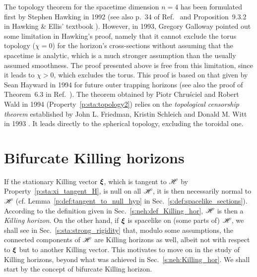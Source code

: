 \begin{hist}
The topology theorem for the spacetime dimension $n=4$ has been formulated
first by Stephen Hawking in 1992 \cite{Hawki72}
(see also p.~34 of Ref.~\cite{Hawki73} and Proposition~9.3.2 in Hawking \& Ellis' textbook
\cite{HawkiE73}).
However, in 1993, Gregory Galloway \cite{Gallo94}
pointed out some limitation in Hawking's proof, namely that it cannot
exclude the torus topology ($\chi = 0$) for the horizon's cross-sections
without assuming that the spacetime is analytic, which is a much stronger
assumption than the usually assumed smoothness.
The proof presented above is free from this limitation, since it leads to
$\chi > 0$, which excludes the torus. This proof is based on that given
by Sean Hayward in 1994 \cite{Haywa94}
for future outer trapping horizons (see also the proof of Theorem~6.3 in Ref.~\cite{Newma87}).
The theorem obtained by Piotr Chru\'sciel
and Robert Wald in 1994 \cite{ChrusW94b}
(Property~\ref{p:sta:topology2})
relies on the \emph{topological censorship theorem} established by
John L. Friedman, Kristin Schleich
and Donald M. Witt in 1993 \cite{FriedSW93}.
It leads directly to the spherical topology, excluding the toroidal one.
\end{hist}



\section{Bifurcate Killing horizons} \label{s:sta:bifur_Killing_hor}

If the stationary Killing vector $\bm{\xi}$,
which is tangent to $\mathscr{H}$ by Property~\ref{p:sta:xi_tangent_H},
is null on all $\mathscr{H}$, it is then necessarily normal to $\mathscr{H}$
(cf. Lemma~\ref{p:def:tangent_to_null_hyp} in Sec.~\ref{s:def:spacelike_sections}).
According to the definition given in Sec.~\ref{s:neh:def_Killing_hor},
$\mathscr{H}$ is then a \emph{Killing horizon}.
On the other hand, if $\bm{\xi}$ is spacelike on (some parts of) $\mathscr{H}$,
we shall see in Sec.~\ref{s:sta:strong_rigidity} that, modulo some
assumptions, the connected components of $\mathscr{H}$ are Killing
horizons as well, albeit not with respect to $\bm{\xi}$ but to another
Killing vector. This motivates to move on in the study of Killing horizons,
beyond what was achieved in Sec.~\ref{s:neh:Killing_hor}. We shall start
by the concept of bifurcate Killing horizon.

